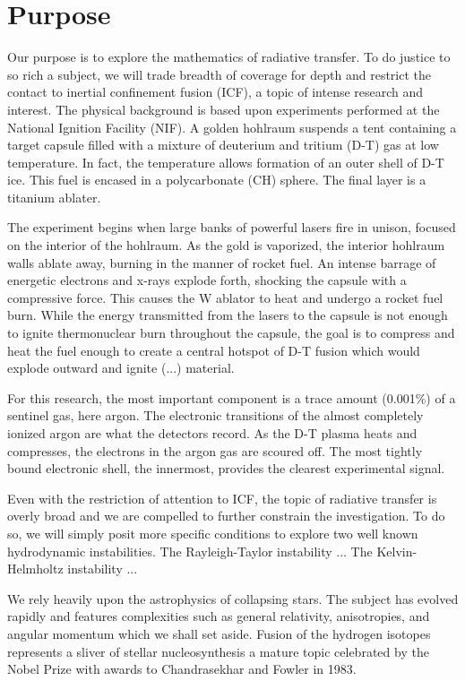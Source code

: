 \section{Purpose}

Our purpose is to explore the mathematics of radiative transfer. To do justice to so rich a subject, we will trade breadth of coverage for depth and restrict the contact to inertial confinement fusion (ICF), a topic of intense research and interest. The physical background is based upon experiments performed at the National Ignition Facility (NIF). A golden hohlraum suspends a tent containing a target capsule filled with a mixture of deuterium and tritium (D-T) gas at low temperature. In fact, the temperature allows formation of an outer shell of D-T ice. This fuel is encased in a polycarbonate (CH) sphere. The final layer is a titanium ablater.

The experiment begins when large banks of powerful lasers fire in unison, focused on the interior of the hohlraum. As the gold is vaporized, the interior hohlraum walls ablate away, burning in the manner of rocket fuel. An intense barrage of energetic electrons and x-rays explode forth, shocking the capsule with a compressive force. This causes the W ablator to heat and undergo a rocket fuel burn. While the energy transmitted from the lasers to the capsule is not enough to ignite thermonuclear burn throughout the capsule, the goal is to compress and heat the fuel enough to create a central hotspot of D-T fusion which would explode outward and ignite (...) material. 

For this research, the most important component is a trace amount (0.001\%) of a sentinel gas, here argon. The electronic transitions of the almost completely ionized argon are what the detectors record. As the D-T plasma heats and compresses, the electrons in the argon gas are scoured off. The most tightly bound electronic shell, the innermost, provides the clearest experimental signal.

Even with the restriction of attention to ICF, the topic of radiative transfer is overly broad and we are compelled to further constrain the investigation. To do so, we will simply posit more specific conditions to explore two well known hydrodynamic instabilities. The Rayleigh-Taylor instability ... The Kelvin-Helmholtz instability ...

We rely heavily upon the astrophysics of collapsing stars. The subject has evolved rapidly and features complexities such as general relativity, anisotropies, and angular momentum which we shall set aside.   Fusion of the hydrogen isotopes represents a sliver of stellar nucleosynthesis a mature topic celebrated by the Nobel Prize with awards to Chandrasekhar and Fowler in 1983.

